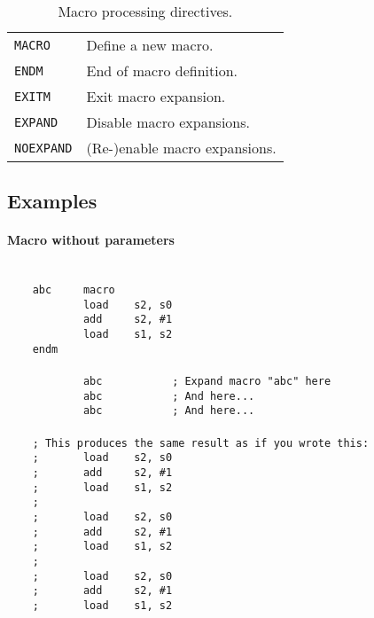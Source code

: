        \begin{table}[h!]
            \begin{tabular}{|ll|}
                \hline
                \texttt{MACRO}      & Define a new macro. \\
                \texttt{ENDM}       & End of macro definition. \\
                \texttt{EXITM}      & Exit macro expansion. \\
                \texttt{EXPAND}     & Disable macro expansions.\\
                \texttt{NOEXPAND}   & (Re-)enable macro expansions.\\
                \hline
            \end{tabular}
            \caption{Macro processing directives.}
        \end{table}

    \subsection{Examples}
        \paragraph{Macro without parameters}
        ~\\
        \verb'    abc     macro'\\
        \verb'            load    s2, s0'\\
        \verb'            add     s2, #1'\\
        \verb'            load    s1, s2'\\
        \verb'    endm'\\
        \verb''\\
        \verb'            abc           ; Expand macro "abc" here'\\
        \verb'            abc           ; And here...'\\
        \verb'            abc           ; And here...'\\
        \verb''\\
        \verb'    ; This produces the same result as if you wrote this:'\\
        \verb'    ;       load    s2, s0'\\
        \verb'    ;       add     s2, #1'\\
        \verb'    ;       load    s1, s2'\\
        \verb'    ;'\\
        \verb'    ;       load    s2, s0'\\
        \verb'    ;       add     s2, #1'\\
        \verb'    ;       load    s1, s2'\\
        \verb'    ;'\\
        \verb'    ;       load    s2, s0'\\
        \verb'    ;       add     s2, #1'\\
        \verb'    ;       load    s1, s2'\\


